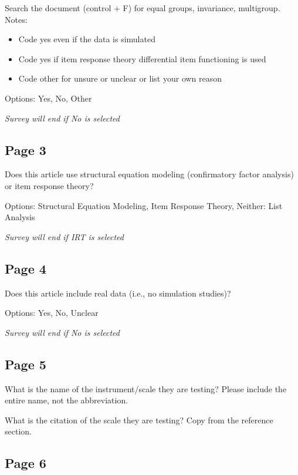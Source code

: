 \documentclass[
  man]{apa7}
\providecommand{\tightlist}{%
  \setlength{\itemsep}{0pt}\setlength{\parskip}{0pt}}
\begin{document}
Search the document (control + F) for equal groups, invariance, multigroup. Notes:

\begin{itemize}
\tightlist
\item
  Code yes even if the data is simulated
\item
  Code yes if item response theory differential item functioning is used
\item
  Code other for unsure or unclear or list your own reason
\end{itemize}

Options: Yes, No, Other

\emph{Survey will end if No is selected}

\hypertarget{page-3}{%
\subsection{Page 3}\label{page-3}}

Does this article use structural equation modeling (confirmatory factor analysis) or item response theory?

Options: Structural Equation Modeling, Item Response Theory, Neither: List Analysis

\emph{Survey will end if IRT is selected}

\hypertarget{page-4}{%
\subsection{Page 4}\label{page-4}}

Does this article include real data (i.e., no simulation studies)?

Options: Yes, No, Unclear

\emph{Survey will end if No is selected}

\hypertarget{page-5}{%
\subsection{Page 5}\label{page-5}}

What is the name of the instrument/scale they are testing? Please include the entire name, not the abbreviation.

What is the citation of the scale they are testing? Copy from the reference section.

\hypertarget{page-6}{%
\subsection{Page 6}\label{page-6}}
\end{document}
